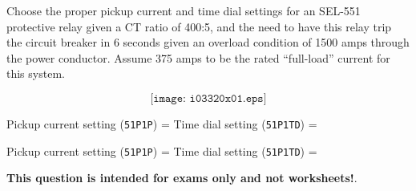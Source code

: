 

Choose the proper pickup current and time dial settings for an SEL-551 protective relay given a CT ratio of 400:5, and the need to have this relay trip the circuit breaker in 6 seconds given an overload condition of 1500 amps through the power conductor.  Assume 375 amps to be the rated ``full-load'' current for this system.

$$\texttt{[image: i03320x01.eps]}$$

Pickup current setting ({\tt 51P1P}) = \underbar{\hskip 50pt} \hskip 30pt Time dial setting ({\tt 51P1TD}) = \underbar{\hskip 50pt}







Pickup current setting ({\tt 51P1P}) =  \hskip 30pt Time dial setting ({\tt 51P1TD}) = 







{\bf This question is intended for exams only and not worksheets!}.



